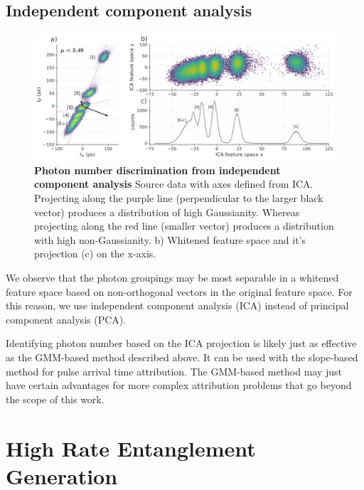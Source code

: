 \documentclass[11pt]{caltech_thesis} %
\begin{document}
\hypertarget{independent-component-analysis}{%
\section{Independent component analysis}\label{independent-component-analysis}}

\hypertarget{fig:ica_pnr}{%
\begin{figure}
\centering
\includegraphics[width=1\textwidth,height=\textheight]{./chapter_04/figs/ICA_component_analysis_light.pdf}
\caption[{Photon number discrimination from independent component analysis}]{\textbf{Photon number discrimination from independent component analysis} Source data with axes defined from ICA. Projecting along the purple line (perpendicular to the larger black vector) produces a distribution of high Gaussianity. Whereas projecting along the red line (smaller vector) produces a distribution with high non-Gaussianity. b) Whitened feature space and it's projection (c) on the x-axis.}
\label{fig:ica_pnr}
\end{figure}
}

We observe that the photon groupings may be most separable in a whitened feature space based on non-orthogonal vectors in the original feature space. For this reason, we use independent component analysis (ICA) instead of principal component analysis (PCA).

Identifying photon number based on the ICA projection is likely just as effective as the GMM-based method described above. It can be used with the slope-based method for pulse arrival time attribution. The GMM-based method may just have certain advantages for more complex attribution problems that go beyond the scope of this work.

\hypertarget{high-rate-entanglement-generation}{%
\chapter{High Rate Entanglement Generation}\label{high-rate-entanglement-generation}}
\end{document}
